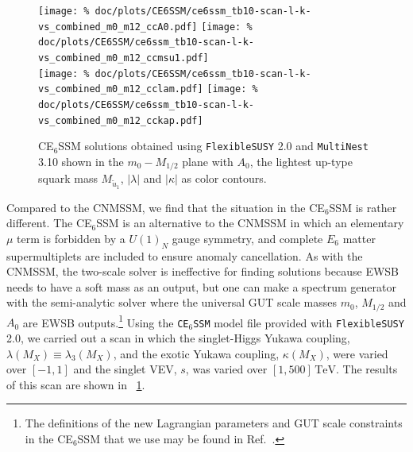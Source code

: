 \documentclass[final,3p,11pt,pdflatex]{elsarticle}
\makeatletter
\newcommand{\modelname}[1]{\texttt{#1}\@\xspace}
\newcommand{\fs}{\texttt{FlexibleSUSY}\@\xspace}
\newcommand{\multinest}{\texttt{MultiNest}\@\xspace}
\newcommand{\fstwo}{\fs 2.0\@\xspace}
\newcommand{\ESSM}{E$_6$SSM\@\xspace}
\newcommand{\unit}[1]{\,\text{#1}}      %
\newcommand{\figref}[1]{\figurename~\ref{#1}}
\newcommand{\azero}{\ensuremath{A_0}\xspace}
\newcommand{\mhalf}{\ensuremath{M_{1/2}}\xspace}
\newcommand{\mzero}{\ensuremath{m_0}\xspace}
\makeatother
\begin{document}
\begin{figure}[tbh]
  \centering
  \texttt{[image: \%
     doc/plots/CE6SSM/ce6ssm\_tb10-scan-l-k-vs\_combined\_m0\_m12\_ccA0.pdf]}
   \texttt{[image: \%
     doc/plots/CE6SSM/ce6ssm\_tb10-scan-l-k-vs\_combined\_m0\_m12\_ccmsu1.pdf]} \\
  \texttt{[image: \%
    doc/plots/CE6SSM/ce6ssm\_tb10-scan-l-k-vs\_combined\_m0\_m12\_cclam.pdf]}
   \texttt{[image: \%
    doc/plots/CE6SSM/ce6ssm\_tb10-scan-l-k-vs\_combined\_m0\_m12\_cckap.pdf]}
   \caption{C\ESSM solutions obtained using \fstwo and \multinest 3.10 shown in
     the $\mzero-\mhalf$ plane with $\azero$, the lightest up-type squark mass
     $M_{\tilde{u}_1}$,  $|\lambda|$ and $|\kappa|$ as color contours.}
  \label{fig:ce6ssm_solutions}
\end{figure}

Compared to the CNMSSM, we find that the situation in the C\ESSM is rather
different.  The C\ESSM is an alternative to the CNMSSM in which an elementary
$\mu$ term is forbidden by a $U(1)_N$ gauge symmetry, and complete $E_6$ matter
supermultiplets are included to ensure anomaly cancellation.  As with the
CNMSSM, the two-scale solver is ineffective for finding solutions because EWSB
needs to have a soft mass as an output, but one can make a spectrum generator
with the semi-analytic solver where the universal GUT scale masses $\mzero$,
$\mhalf$ and $\azero$ are EWSB outputs.\footnote{The definitions of the
  new Lagrangian parameters and GUT scale constraints in the C\ESSM that we
  use may be found in Ref.~\cite{Athron:2009bs}.}  Using the \modelname{C\ESSM}
model file provided with \fstwo, we carried out a scan in which the
singlet-Higgs Yukawa coupling, $\lambda(M_X) \equiv \lambda_3(M_X)$, and the
exotic Yukawa coupling, $\kappa(M_X)$, were varied over $[-1,1]$ and the singlet
VEV, $s$, was varied over $[1,500] \unit{TeV}$.  The results of this scan are
shown in \figref{fig:ce6ssm_solutions}.
\end{document}
